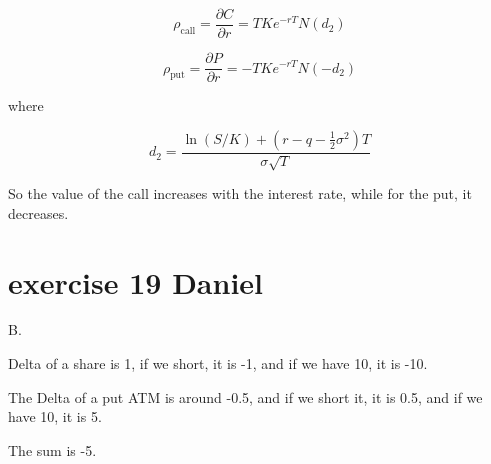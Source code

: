 \documentclass{article}
\begin{document}
\[
    \rho_{\text{call}} = \frac{\partial C}{\partial r} = T K e^{-rT} N(d_2)
\]

\[
    \rho_{\text{put}} = \frac{\partial P}{\partial r} = -T K e^{-rT} N(-d_2)
\]

where

\[
    d_2 = \frac{\ln(S/K) + (r - q - \tfrac{1}{2} \sigma^2) T}{\sigma \sqrt{T}}
\]

So the value of the call increases with the interest rate, while for the put, it decreases.

\section{exercise 19 Daniel}
B.

Delta of a share is 1, if we short, it is -1, and if we have 10, it is -10.

The Delta of a put ATM is around -0.5, and if we short it, it is 0.5, and if we have 10, it is 5.

The sum is -5.
\end{document}
